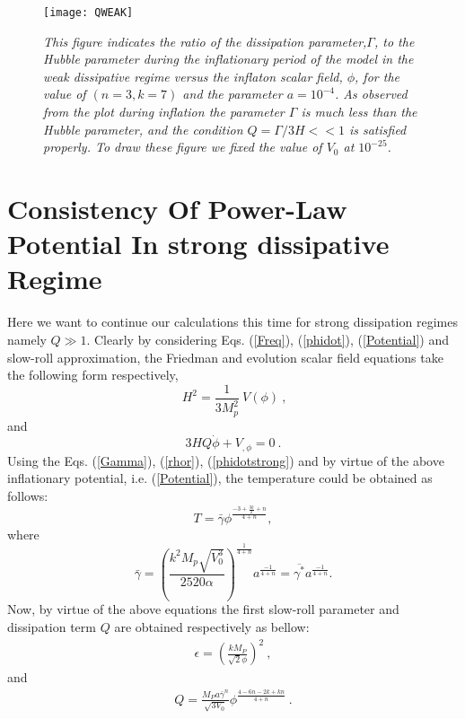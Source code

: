 \documentclass[12pt]{revtex4}
\begin{document}
\begin{figure}[ht]
  \centering
  \texttt{[image: QWEAK]}
  \caption{\emph{{{This figure indicates the ratio of the dissipation parameter,$\Gamma$, to the Hubble parameter during the inflationary period of the  model in the weak dissipative regime versus the inflaton scalar field, $\phi$, for the value of $(n=3,k=7)$ and the parameter $a=10^{-4}$. As observed from the plot during inflation the parameter $\Gamma$ is much less than the Hubble parameter, and the condition $Q=\Gamma/3H<<1$ is satisfied properly. To draw these figure we fixed the value of $V_0$ at $10^{-25}$}}.}}\label{Qweak}
\end{figure}%


\section{Consistency Of Power-Law Potential In strong dissipative Regime }\label{strongpl}
Here we want to continue our calculations {this time} for strong dissipation regimes namely $Q\gg1$. {Clearly} by considering Eqs. (\ref{Freq}), (\ref{phidot}), (\ref{Potential})
  and slow-roll approximation, the Friedman and evolution scalar field equations take the following form respectively,
  \begin{equation}
\ H^2=\frac{1}{3M^2_p}{\ V(\phi)}~, \label{WeakFreq}%
\end{equation}
and
\begin{equation}\label{phidotstrong}
 3H Q\dot \phi  + V_{,\phi} = 0~.
\end{equation}
Using the Eqs. (\ref{Gamma}), (\ref{rhor}),  (\ref{phidotstrong}) and by virtue of the above inflationary potential, i.e.  (\ref{Potential}), the temperature could be obtained as follows:
\begin{equation}\label{tempStrong}
T=\bar{\gamma} {\phi ^{\frac{{ - 3 + \frac{{3k}}{2} + n}}{{4 + n}}}},
\end{equation}
where \[\bar{\gamma}={(\frac{{{k^2}{M_p}\sqrt {V_0^3} }}{{2520\alpha }})^{\frac{1}{{4 + n}}}}{a^{\frac{{ - 1}}{{4 + n}}}} = \overline {{\gamma ^*}} {a^{\frac{{ - 1}}{{4 + n}}}}.\]
Now, by virtue  of the above equations the first slow-roll parameter  and dissipation term $Q$ are obtained respectively as bellow:
\begin{eqnarray}\label{epsilon-strong}
\epsilon= {(\frac{{k{M_P}}}{{\sqrt 2 \phi }})^2}~,
\end{eqnarray}
and
\begin{eqnarray}
Q = \frac{{{M_P}a{{\bar \gamma }^n}}}{{\sqrt {3{V_0}} }}{\phi ^{\frac{{4 - 6n - 2k + kn}}{{4 + n}}}}~.\label{srw}
\end{eqnarray}
\end{document}
